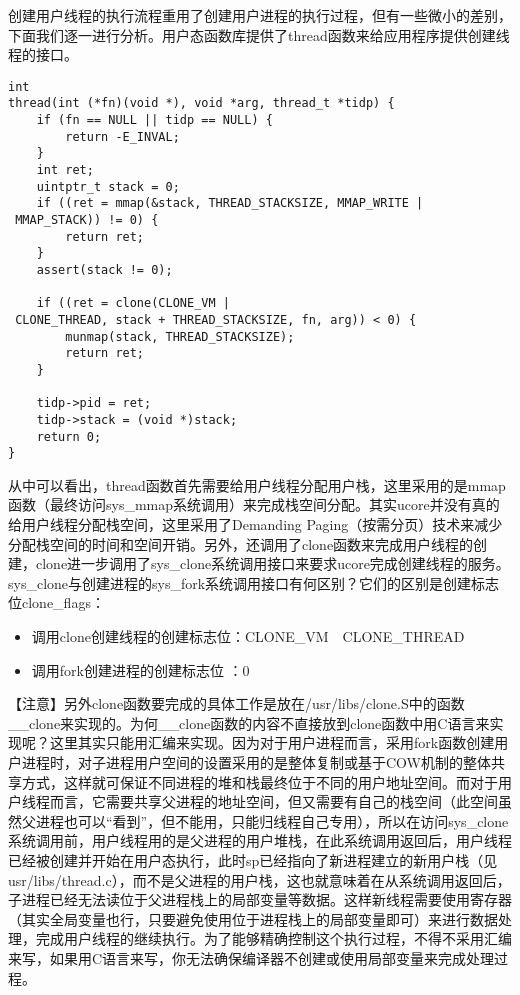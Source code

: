创建用户线程的执行流程重用了创建用户进程的执行过程，但有一些微小的差别，下面我们逐一进行分析。用户态函数库提供了thread函数来给应用程序提供创建线程的接口。

\begin{lstlisting}
int
thread(int (*fn)(void *), void *arg, thread_t *tidp) {
    if (fn == NULL || tidp == NULL) {
        return -E_INVAL;
    }
    int ret;
    uintptr_t stack = 0;
    if ((ret = mmap(&stack, THREAD_STACKSIZE, MMAP_WRITE | MMAP_STACK)) != 0) {
        return ret;
    }
    assert(stack != 0);

    if ((ret = clone(CLONE_VM | CLONE_THREAD, stack + THREAD_STACKSIZE, fn, arg)) < 0) {
        munmap(stack, THREAD_STACKSIZE);
        return ret;
    }

    tidp->pid = ret;
    tidp->stack = (void *)stack;
    return 0;
}
\end{lstlisting}

从中可以看出，thread函数首先需要给用户线程分配用户栈，这里采用的是mmap函数（最终访问sys\_mmap系统调用）来完成栈空间分配。其实ucore并没有真的给用户线程分配栈空间，这里采用了Demanding
Paging（按需分页）技术来减少分配栈空间的时间和空间开销。另外，还调用了clone函数来完成用户线程的创建，clone进一步调用了sys\_clone系统调用接口来要求ucore完成创建线程的服务。sys\_clone与创建进程的sys\_fork系统调用接口有何区别？它们的区别是创建标志位clone\_flags：

\begin{itemize}
\tightlist
\item
  调用clone创建线程的创建标志位：CLONE\_VM~\textbar{}~CLONE\_THREAD
\item
  调用fork创建进程的创建标志位 ：0
\end{itemize}

【注意】另外clone函数要完成的具体工作是放在/usr/libs/clone.S中的函数\_\_clone来实现的。为何\_\_clone函数的内容不直接放到clone函数中用C语言来实现呢？这里其实只能用汇编来实现。因为对于用户进程而言，采用fork函数创建用户进程时，对子进程用户空间的设置采用的是整体复制或基于COW机制的整体共享方式，这样就可保证不同进程的堆和栈最终位于不同的用户地址空间。而对于用户线程而言，它需要共享父进程的地址空间，但又需要有自己的栈空间（此空间虽然父进程也可以``看到''，但不能用，只能归线程自己专用），所以在访问sys\_clone系统调用前，用户线程用的是父进程的用户堆栈，在此系统调用返回后，用户线程已经被创建并开始在用户态执行，此时sp已经指向了新进程建立的新用户栈（见usr/libs/thread.c），而不是父进程的用户栈，这也就意味着在从系统调用返回后，子进程已经无法读位于父进程栈上的局部变量等数据。这样新线程需要使用寄存器（其实全局变量也行，只要避免使用位于进程栈上的局部变量即可）来进行数据处理，完成用户线程的继续执行。为了能够精确控制这个执行过程，不得不采用汇编来写，如果用C语言来写，你无法确保编译器不创建或使用局部变量来完成处理过程。

